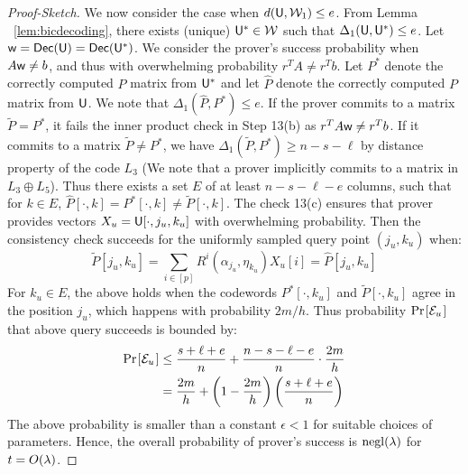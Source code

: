 \begin{proof}[Proof-Sketch]
We now consider the case when $d(\mathsf{U},\mathcal{W}_1)\leq e$. From Lemma
~\ref{lem:bicdecoding}, there exists (unique) $\mathsf{U}^*\in \mathcal{W}$
such that $\Delta_1(\mathsf{U},\mathsf{U}^*)\leq e$.
Let $\mathsf{w}=\mathsf{Dec}(\mathsf{U})=\mathsf{Dec}(\mathsf{U}^*)$. We consider the prover's success
probability when $A\mathsf{w}\neq b$, and thus with overwhelming probability $r^TA\neq
r^Tb$. Let $P^*$ denote the correctly computed $P$ matrix from $\mathsf{U}^*$ and let
$\hat{P}$ denote the correctly computed $P$ matrix from $\mathsf{U}$. We note that
$\Delta_1(\hat{P},P^*)\leq e$. If the 
prover commits to a matrix $\tilde{P}=P^*$, it fails the inner product check in Step
13(b) as $r^TA\mathsf{w}\neq r^Tb$. If it commits to a matrix $\tilde{P}\neq P^*$, we have
$\Delta_1(\tilde{P},P^*)\geq n-s-\ell$ by distance property of the code $L_3$
(We note that a prover implicitly commits to a matrix in $L_3\oplus L_5$).
Thus there exists a set $E$ of at least $n-s-\ell-e$ columns, such that for
$k\in E$, $\hat{P}[\cdot,k]=P^*[\cdot,k]\neq \tilde{P}[\cdot,k]$. The check
 13(c) ensures that prover provides vectors $X_u=\mathsf{U}[\cdot,j_u,k_u]$ with
overwhelming probability. Then the consistency check succeeds for the 
uniformly sampled query point $(j_u,k_u)$ when:
\[ \tilde{P}[j_u,k_u] = \sum_{i\in [p]}R^i(\alpha_{j_u},\eta_{k_u})X_u[i] =
\hat{P}[j_u,k_u] \]
For $k_u\in E$, the above holds when the codewords $P^*[\cdot,k_u]$ and
$\tilde{P}[\cdot,k_u]$ agree in the position $j_u$, which happens with 
probability $2m/h$. Thus probability $\prob{\mc{E}_u}$ that above query succeeds is bounded by:
{\small
\begin{align*}
\prob{\mc{E}_u}&\leq \frac{s+\ell+e}{n} + \frac{n-s-\ell-e}{n}\cdot\frac{2m}{h}
\\
&= \frac{2m}{h}+\left(1-\frac{2m}{h}\right)\left(\frac{s+\ell+e}{n}\right)
\end{align*}
}
The above probability is smaller than a constant $\epsilon<1$ for suitable
choices of parameters. Hence, the overall probability of prover's success is
$\mathrm{negl}(\lambda)$ for $t=O(\lambda)$.
\end{proof}

